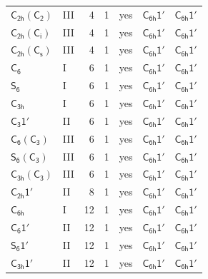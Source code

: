 \documentclass[10pt,a4paper]{article}
\numberwithin{equation}{section}
\newcommand{\grp}[1]{\mathsf{#1}}
\begin{document}
{\begin{longtable}{@{}llrrlll@{}}
\href{C2h-C2.pdf}{$\grp{C_{2h}}(\grp{C_{2}})$} & III & 4 & 1 & yes & \href{C6h-1p.pdf}{$\grp{C_{6h}1'}$} & \href{C6h-1p.pdf}{$\grp{C_{6h}1'}$}\\
\href{C2h-S2.pdf}{$\grp{C_{2h}}(\grp{C_{i}})$} & III & 4 & 1 & yes & \href{C6h-1p.pdf}{$\grp{C_{6h}1'}$} & \href{C6h-1p.pdf}{$\grp{C_{6h}1'}$}\\
\href{C2h-C1v.pdf}{$\grp{C_{2h}}(\grp{C_{s}})$} & III & 4 & 1 & yes & \href{C6h-1p.pdf}{$\grp{C_{6h}1'}$} & \href{C6h-1p.pdf}{$\grp{C_{6h}1'}$}\\
\href{../../../rotation/data/pdf/C6.pdf}{$\grp{C_{6}}$} & I & 6 & 1 & yes & \href{C6h-1p.pdf}{$\grp{C_{6h}1'}$} & \href{C6h-1p.pdf}{$\grp{C_{6h}1'}$}\\
\href{../../../rotation/data/pdf/S6.pdf}{$\grp{S_{6}}$} & I & 6 & 1 & yes & \href{C6h-1p.pdf}{$\grp{C_{6h}1'}$} & \href{C6h-1p.pdf}{$\grp{C_{6h}1'}$}\\
\href{../../../rotation/data/pdf/C3h.pdf}{$\grp{C_{3h}}$} & I & 6 & 1 & yes & \href{C6h-1p.pdf}{$\grp{C_{6h}1'}$} & \href{C6h-1p.pdf}{$\grp{C_{6h}1'}$}\\
\href{C3-1p.pdf}{$\grp{C_{3}1'}$} & II & 6 & 1 & yes & \href{C6h-1p.pdf}{$\grp{C_{6h}1'}$} & \href{C6h-1p.pdf}{$\grp{C_{6h}1'}$}\\
\href{C6-C3.pdf}{$\grp{C_{6}}(\grp{C_{3}})$} & III & 6 & 1 & yes & \href{C6h-1p.pdf}{$\grp{C_{6h}1'}$} & \href{C6h-1p.pdf}{$\grp{C_{6h}1'}$}\\
\href{S6-C3.pdf}{$\grp{S_{6}}(\grp{C_{3}})$} & III & 6 & 1 & yes & \href{C6h-1p.pdf}{$\grp{C_{6h}1'}$} & \href{C6h-1p.pdf}{$\grp{C_{6h}1'}$}\\
\href{C3h-C3.pdf}{$\grp{C_{3h}}(\grp{C_{3}})$} & III & 6 & 1 & yes & \href{C6h-1p.pdf}{$\grp{C_{6h}1'}$} & \href{C6h-1p.pdf}{$\grp{C_{6h}1'}$}\\
\href{C2h-1p.pdf}{$\grp{C_{2h}1'}$} & II & 8 & 1 & yes & \href{C6h-1p.pdf}{$\grp{C_{6h}1'}$} & \href{C6h-1p.pdf}{$\grp{C_{6h}1'}$}\\
\href{../../../rotation/data/pdf/C6h.pdf}{$\grp{C_{6h}}$} & I & 12 & 1 & yes & \href{C6h-1p.pdf}{$\grp{C_{6h}1'}$} & \href{C6h-1p.pdf}{$\grp{C_{6h}1'}$}\\
\href{C6-1p.pdf}{$\grp{C_{6}1'}$} & II & 12 & 1 & yes & \href{C6h-1p.pdf}{$\grp{C_{6h}1'}$} & \href{C6h-1p.pdf}{$\grp{C_{6h}1'}$}\\
\href{S6-1p.pdf}{$\grp{S_{6}1'}$} & II & 12 & 1 & yes & \href{C6h-1p.pdf}{$\grp{C_{6h}1'}$} & \href{C6h-1p.pdf}{$\grp{C_{6h}1'}$}\\
\href{C3h-1p.pdf}{$\grp{C_{3h}1'}$} & II & 12 & 1 & yes & \href{C6h-1p.pdf}{$\grp{C_{6h}1'}$} & \href{C6h-1p.pdf}{$\grp{C_{6h}1'}$}\\

\end{longtable}}
\end{document}
